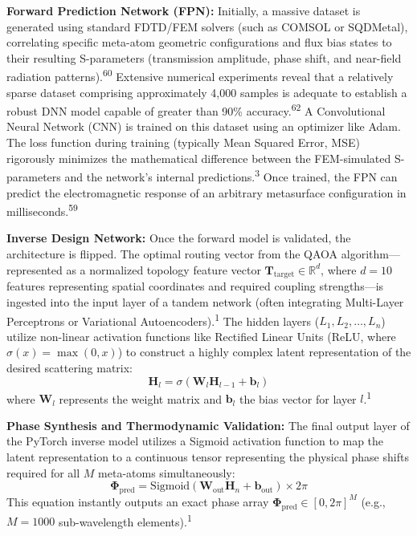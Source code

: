 \documentclass[11pt, a4paper]{article}
\begin{document}
\textbf{Forward Prediction Network (FPN):} Initially, a massive dataset is generated using standard FDTD/FEM solvers (such as COMSOL or SQDMetal), correlating specific meta-atom geometric configurations and flux bias states to their resulting S-parameters (transmission amplitude, phase shift, and near-field radiation patterns).\textsuperscript{60} Extensive numerical experiments reveal that a relatively sparse dataset comprising approximately 4,000 samples is adequate to establish a robust DNN model capable of greater than 90\% accuracy.\textsuperscript{62} A Convolutional Neural Network (CNN) is trained on this dataset using an optimizer like Adam. The loss function during training (typically Mean Squared Error, MSE) rigorously minimizes the mathematical difference between the FEM-simulated S-parameters and the network's internal predictions.\textsuperscript{3} Once trained, the FPN can predict the electromagnetic response of an arbitrary metasurface configuration in milliseconds.\textsuperscript{59}

\textbf{Inverse Design Network:} Once the forward model is validated, the architecture is flipped. The optimal routing vector from the QAOA algorithm---represented as a normalized topology feature vector $\mathbf{T}_{\text{target}} \in \mathbb{R}^d$, where $d=10$ features representing spatial coordinates and required coupling strengths---is ingested into the input layer of a tandem network (often integrating Multi-Layer Perceptrons or Variational Autoencoders).\textsuperscript{1} The hidden layers ($L_1, L_2, \dots, L_n$) utilize non-linear activation functions like Rectified Linear Units (ReLU, where $\sigma(x) = \max(0, x)$) to construct a highly complex latent representation of the desired scattering matrix:
\begin{equation}
\mathbf{H}_l = \sigma(\mathbf{W}_l \mathbf{H}_{l-1} + \mathbf{b}_l)
\end{equation}
where $\mathbf{W}_l$ represents the weight matrix and $\mathbf{b}_l$ the bias vector for layer $l$.\textsuperscript{1}

\textbf{Phase Synthesis and Thermodynamic Validation:} The final output layer of the PyTorch inverse model utilizes a Sigmoid activation function to map the latent representation to a continuous tensor representing the physical phase shifts required for all $M$ meta-atoms simultaneously:
\begin{equation}
\mathbf{\Phi}_{\text{pred}} = \text{Sigmoid}(\mathbf{W}_{\text{out}} \mathbf{H}_n + \mathbf{b}_{\text{out}}) \times 2\pi
\end{equation}
This equation instantly outputs an exact phase array $\mathbf{\Phi}_{\text{pred}} \in [0, 2\pi]^M$ (e.g., $M = 1000$ sub-wavelength elements).\textsuperscript{1}
\end{document}
